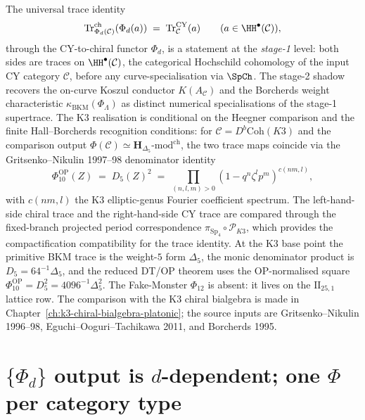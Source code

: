 \begin{remark}
\label{rem:phiutp-k3-base-identity}
The universal trace identity
\[
\mathrm{Tr}^{\mathrm{ch}}_{\Phi_d(\mathcal C)}(\Phi_d(a)) \;=\; \mathrm{Tr}^{\mathrm{CY}}_{\mathcal C}(a)
\qquad (a \in \HH^\bullet(\mathcal C)),
\]
through the CY-to-chiral functor $\Phi_d$,
is a statement at the \emph{stage-1} level: both sides are traces on $\HH^\bullet(\mathcal{C})$,
the categorical Hochschild cohomology of the input CY category $\mathcal{C}$, before any curve-specialisation via $\SpCh$.
The stage-2 shadow recovers the on-curve Koszul conductor
$K(A_{\mathcal{C}})$ and the Borcherds weight characteristic
$\kappa_{\mathrm{BKM}}(\Phi_\Lambda)$ as distinct numerical
specialisations of the stage-1 supertrace.
The K3 realisation is conditional on the Heegner comparison
and the finite Hall--Borcherds recognition conditions:
for $\mathcal C = D^b\mathrm{Coh}(K3)$ and the comparison output
$\Phi(\mathcal C) \simeq \mathbf H_{\Delta_5}\text{-}\mathrm{mod}^{\mathrm{ch}}$,
the two trace maps coincide via the Gritsenko--Nikulin 1997--98 denominator
identity
\[
\Phi_{10}^{\mathrm{OP}}(Z) \;=\; D_5(Z)^2
\;=\;\prod_{(n,l,m)>0}(1 - q^n\zeta^l p^m)^{c(nm,l)},
\]
with $c(nm,l)$ the K3 elliptic-genus Fourier coefficient spectrum.
The left-hand-side chiral trace and the right-hand-side CY trace are
compared through the fixed-branch projected period correspondence
\(\pi_{\mathrm{Sp}_4}\circ\mathscr P_{K3}\), which provides the compactification compatibility for the trace
identity. At the K3 base point the primitive BKM trace is the
weight-$5$ form \(\Delta_5\), the monic denominator product is
\(D_5=64^{-1}\Delta_5\), and the reduced DT/OP theorem uses the
OP-normalised square
\(\Phi_{10}^{\mathrm{OP}}=D_5^2=4096^{-1}\Delta_5^2\). The
Fake-Monster $\Phi_{12}$ is absent: it lives on the
$\mathrm{II}_{25,1}$ lattice row. The comparison with the K3 chiral
bialgebra is made in Chapter~\ref{ch:k3-chiral-bialgebra-platonic};
the source inputs are Gritsenko--Nikulin 1996--98,
Eguchi--Ooguri--Tachikawa 2011, and Borcherds 1995.
\end{remark}

\section{\texorpdfstring{$\{\Phi_d\}$}{Phi-d} output is \texorpdfstring{$d$}{d}-dependent; one \texorpdfstring{$\Phi$}{Phi} per category type}
\label{sec:phiutp-d-dependent}

